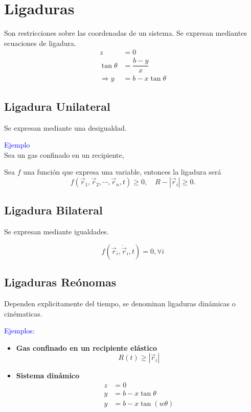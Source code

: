 \documentclass[../main]{subfiles}
\begin{document}
\section{Ligaduras}\label{sec3}

Son restricciones sobre las coordenadas de un sistema. Se expresan mediantes ecuaciones de ligadura.
\begin{align*}
    z&=0\\
    \tan{\theta}&=\dfrac{b-y}{x}\\
    \Rightarrow y&=b-x\tan{\theta}
\end{align*}

\subsection{Ligadura Unilateral}

Se expresan mediante una desigualdad.

\textcolor{blue}{Ejemplo} \\
Sea un gas confinado en un recipiente,

Sea $f$ una función que expresa una variable, entonces la ligadura será
\begin{equation}
    f(\vec{r}_1, \vec{r}_2, \cdots , \vec{r}_n, t)\geq 0, \quad R-|\vec{r}_i|\geq 0.
\end{equation}

\subsection{Ligadura Bilateral}

Se expresan mediante igualdades.

\begin{equation}
    f(\vec{r}_i, \dot{\vec{r}}_i, t)=0, \forall i
\end{equation}

\subsection{Ligaduras Reónomas}

Dependen explicitamente del tiempo, se denominan ligaduras dinámicas o cinématicas.

\textcolor{blue}{Ejemplos:} \\
\begin{itemize}
    \item \textbf{Gas confinado en un recipiente elástico}
    \begin{equation}
        R(t) \geq |\vec{r}_i|
    \end{equation}
    \item \textbf{Sistema dinámico}
    \begin{equation}
        \begin{split}
            z&=0 \\
            y&=b-x\tan \theta \\
            y&=b-x\tan(w \theta)
        \end{split}
    \end{equation}
\end{itemize}
\end{document}
